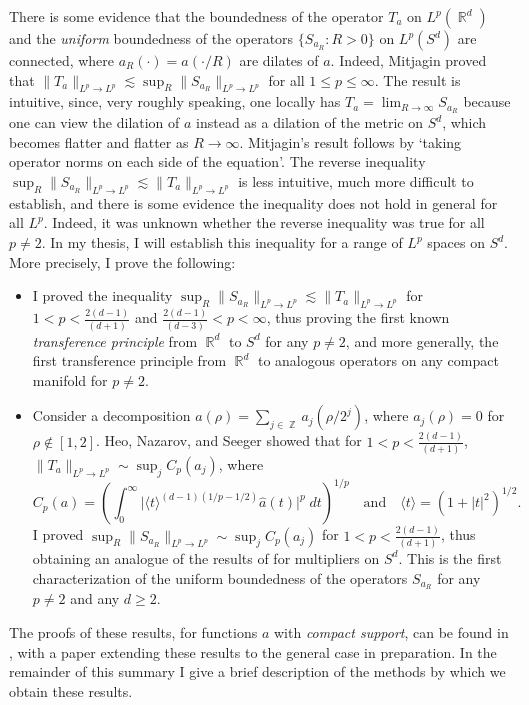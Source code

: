 \documentclass[11pt]{article}
\DeclareMathOperator{\ZZ}{\mathbb{Z}}
\DeclareMathOperator{\RR}{\mathbb{R}}
\begin{document}
There is some evidence that the boundedness of the operator $T_a$ on $L^p(\RR^d)$ and the \emph{uniform} boundedness of the operators $\{ S_{a_R} : R > 0 \}$ on $L^p(S^d)$ are connected, where $a_R(\cdot) = a( \cdot / R)$ are dilates of $a$. Indeed, Mitjagin \cite{Mitjagin} proved that $\| T_a \|_{L^p \to L^p} \lesssim \sup_R \| S_{a_R} \|_{L^p \to L^p}$ for all $1 \leq p \leq \infty$. The result is intuitive, since, very roughly speaking, one locally has $T_a = \lim_{R \to \infty} S_{a_R}$ because one can view the dilation of $a$ instead as a dilation of the metric on $S^d$, which becomes flatter and flatter as $R \to \infty$. Mitjagin's result follows by `taking operator norms on each side of the equation'. The reverse inequality $\sup_R \| S_{a_R} \|_{L^p \to L^p} \lesssim \| T_a \|_{L^p \to L^p}$ is less intuitive, much more difficult to establish, and there is some evidence the inequality does not hold in general for all $L^p$. Indeed, it was unknown whether the reverse inequality was true for all $p \neq 2$. In my thesis, I will establish this inequality for a range of $L^p$ spaces on $S^d$. More precisely, I prove the following:
%
\begin{itemize}
    \item I proved the inequality $\sup_R \| S_{a_R} \|_{L^p \to L^p} \lesssim \| T_a \|_{L^p \to L^p}$ for $1 < p < {\scriptstyle \frac{2(d-1)}{   (d+1)} }$ and ${\scriptstyle \frac{2(d-1)}{(d-3)} } < p < \infty$, thus proving the first known \emph{transference principle} from $\RR^d$ to $S^d$ for any $p \neq 2$, and more generally, the first transference principle from $\RR^d$ to analogous operators on any compact manifold for $p \neq 2$.

    \item Consider a decomposition $a(\rho) = \sum_{j \in \ZZ} a_j(\rho / 2^j)$, where $a_j(\rho) = 0$ for $\rho \not \in [1,2]$. Heo, Nazarov, and Seeger \cite{HeoNazarovSeeger} showed that for $1 < p < {\scriptstyle \frac{2(d-1)}{(d+1)} }$, $\| T_a \|_{L^p \to L^p} \sim \sup\nolimits_j C_p(a_j)$, where
    \[ C_p(a) = \left( \int_0^\infty \big| \langle t \rangle^{(d-1)(1/p - 1/2)} \widehat{a}(t) \big|^p\; dt \right)^{1/p} \quad\text{and}\quad \langle t \rangle = (1 + |t|^2)^{1/2}. \]
    I proved $\sup_R \| S_{a_R} \|_{L^p \to L^p} \sim \sup_j C_p(a_j)$ for $1 < p < {\scriptstyle \frac{2(d-1)}{(d+1)} }$, thus obtaining an analogue of the results of \cite{HeoNazarovSeeger} for multipliers on $S^d$. This is the first characterization of the uniform boundedness of the operators $S_{a_R}$ for any $p \neq 2$ and any $d \geq 2$.
\end{itemize}
%
The proofs of these results, for functions $a$ with \emph{compact support}, can be found in \cite{DensonCharacterization}, with a paper extending these results to the general case in preparation.  In the remainder of this summary I give a brief description of the methods by which we obtain these results.
\end{document}
